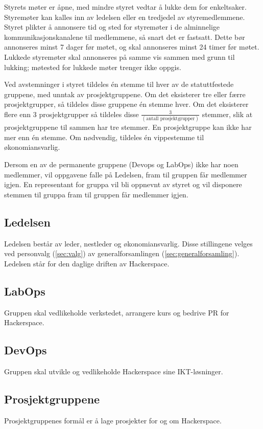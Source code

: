 Styrets møter er åpne, med mindre styret vedtar å lukke dem for enkeltsaker.
Styremøter kan kalles inn av ledelsen eller en tredjedel av styremedlemmene.
Styret plikter å annonsere tid og sted for styremøter i de alminnelige kommunikasjonskanalene til medlemmene, så snart det er fastsatt.
Dette bør annonseres minst 7 dager før møtet, og skal annonseres minst 24 timer før møtet.
Lukkede styremøter skal annonseres på samme vis sammen med grunn til lukking; møtested for lukkede møter trenger ikke oppgis.

Ved avstemninger i styret tildeles én stemme til hver av de statuttfestede gruppene, med unntak av prosjektgruppene. 
Om det eksisterer tre eller færre prosjektgrupper, så tildeles disse gruppene én stemme hver. Om det eksisterer flere enn 3 prosjektgrupper så tildeles disse $\frac{3}{(\text{antall prosjektgrupper})}$ stemmer, slik at prosjektgruppene til sammen har tre stemmer. En prosjektgruppe kan ikke har mer enn én stemme.
Om nødvendig, tildeles én vippestemme til økonomiansvarlig.

Dersom en av de permanente gruppene (Devops og LabOps) ikke har
noen medlemmer, vil oppgavene falle på Ledelsen, fram til gruppen får
medlemmer igjen. En representant for gruppa vil bli oppnevnt av styret og
vil disponere stemmen til gruppa fram til gruppen får medlemmer igjen.


\subsection{Ledelsen}\label{sec:struktur:ledelsen}
Ledelsen består av leder, nestleder og økonomiansvarlig.
Disse stillingene velges ved personvalg (\ref{sec:valg}) av generalforsamlingen (\ref{sec:generalforsamling}).
Ledelsen står for den daglige driften av Hackerspace.

\subsection{LabOps}\label{sec:struktur:labops}
Gruppen skal vedlikeholde verkstedet, arrangere kurs og bedrive PR for Hackerspace.

\subsection{DevOps}\label{sec:struktur:devops}
Gruppen skal utvikle og vedlikeholde Hackerspace sine IKT-løsninger.

\subsection{Prosjektgruppene}\label{sec:struktur:prosjektgruppene}
Prosjektgruppenes formål er å lage prosjekter for og om Hackerspace.

